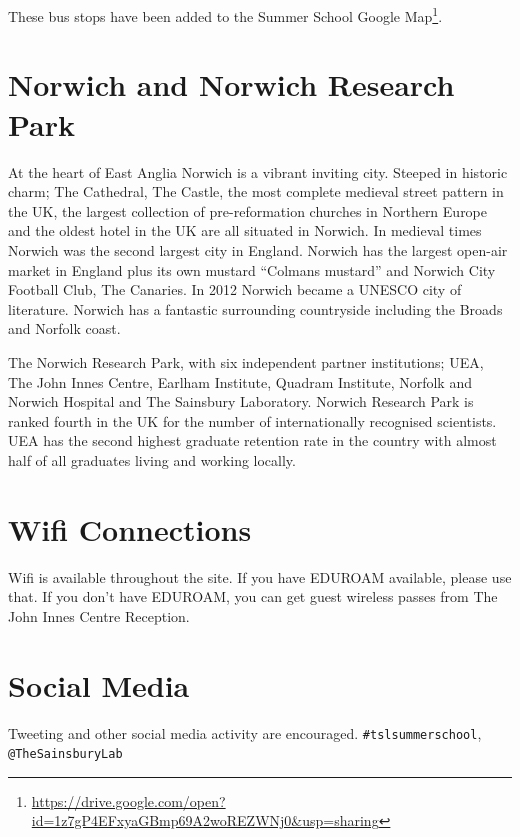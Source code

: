 \documentclass[12pt,]{book}
\let\rmarkdownfootnote\footnote%
\def\footnote{\protect\rmarkdownfootnote}
\renewcommand{\href}[2]{#2\footnote{\url{#1}}}
\begin{document}
These bus stops have been added to the
\href{https://drive.google.com/open?id=1z7gP4EFxyaGBmp69A2woREZWNj0\&usp=sharing}{Summer
School Google Map}.

\section*{Norwich and Norwich Research
Park}\label{norwich-and-norwich-research-park}

At the heart of East Anglia Norwich is a vibrant inviting city. Steeped
in historic charm; The Cathedral, The Castle, the most complete medieval
street pattern in the UK, the largest collection of pre-reformation
churches in Northern Europe and the oldest hotel in the UK are all
situated in Norwich. In medieval times Norwich was the second largest
city in England. Norwich has the largest open-air market in England plus
its own mustard ``Colmans mustard'' and Norwich City Football Club, The
Canaries. In 2012 Norwich became a UNESCO city of literature. Norwich
has a fantastic surrounding countryside including the Broads and Norfolk
coast.

The Norwich Research Park, with six independent partner institutions;
UEA, The John Innes Centre, Earlham Institute, Quadram Institute,
Norfolk and Norwich Hospital and The Sainsbury Laboratory. Norwich
Research Park is ranked fourth in the UK for the number of
internationally recognised scientists. UEA has the second highest
graduate retention rate in the country with almost half of all graduates
living and working locally.

\section*{Wifi Connections}\label{wifi-connections}

Wifi is available throughout the site. If you have EDUROAM available,
please use that. If you don't have EDUROAM, you can get guest wireless
passes from The John Innes Centre Reception.

\section*{Social Media}\label{social-media}

Tweeting and other social media activity are encouraged.
\texttt{\#tslsummerschool}, \texttt{@TheSainsburyLab}
\end{document}
